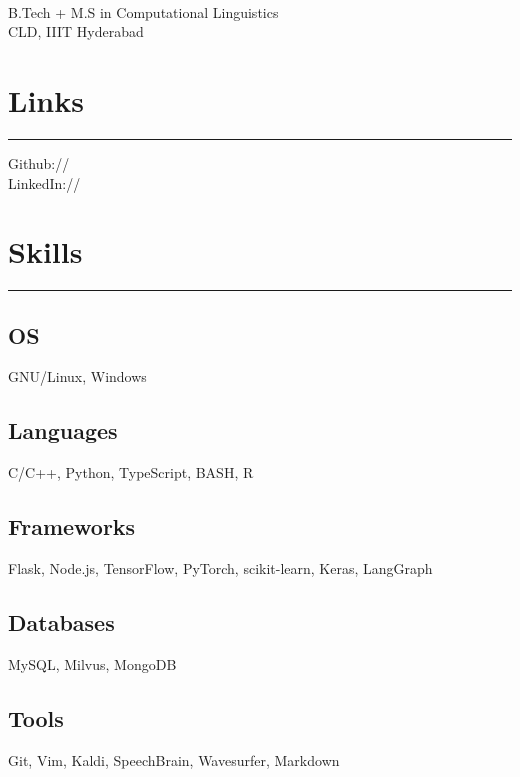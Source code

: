\documentclass[]{rahulworld-resume}
\begin{document}
%
%
\begin{minipage}[t]{0.32\textwidth}
\begin{large}
	\\
\end{large}
B.Tech + M.S in Computational Linguistics\\
CLD, IIIT Hyderabad \\

\section{Links}
\noindent\rule{5cm}{0.4pt}

Github:// \href{https://github.com/So-bonkers}{} \\
LinkedIn:// \href{https://www.linkedin.com/in/shubhankar-kamthankar-8ab0501b5/}{}

\section{Skills}
\noindent\rule{5cm}{0.4pt}
\subsection{OS}
GNU/Linux, Windows
\vspace{6pt}
\subsection{Languages}
C/C++, Python, TypeScript, BASH, R
\vspace{6pt}
\subsection{Frameworks}
Flask, Node.js, TensorFlow, PyTorch, scikit-learn, Keras, LangGraph
\vspace{6pt}
\subsection{Databases}
MySQL, Milvus, MongoDB
\vspace{6pt}
\subsection{Tools}
Git, Vim, Kaldi, SpeechBrain, Wavesurfer, Markdown


\end{minipage}
\end{document}
